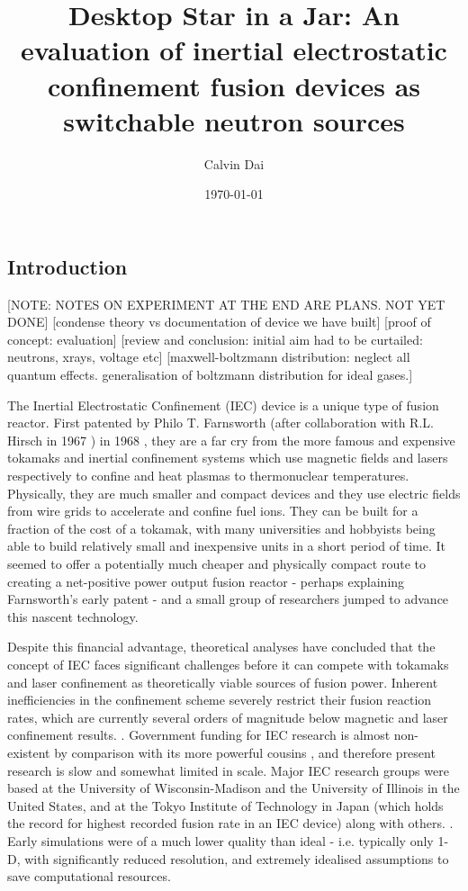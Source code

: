 \documentclass[a4paper,titlepage]{article}
\title{Desktop Star in a Jar: An evaluation of inertial electrostatic confinement fusion devices as switchable neutron sources}
\author{Calvin Dai}
\date{\today}
\let\cite\parencite
\begin{document}
 
\maketitle

\tableofcontents
\newpage
\newpage
\printglossaries
\begin{flushleft}

\section{Introduction}
\label{intro}
[NOTE: NOTES ON EXPERIMENT AT THE END ARE PLANS. NOT YET DONE]
[condense theory vs documentation of device we have built]
[proof of concept: evaluation]
[review and conclusion: initial aim had to be curtailed: neutrons, xrays, voltage etc]
[maxwell-boltzmann distribution: neglect all quantum effects. generalisation of boltzmann distribution for ideal gases.]

The Inertial Electrostatic Confinement (IEC) device is a unique type of fusion reactor. First patented by Philo T. Farnsworth (after collaboration with R.L. Hirsch in 1967 \cite{hirsch_1967_inertialelectrostatic}) in 1968 \cite{farnsworth_1968_method}, they are a far cry from the more famous and expensive tokamaks and inertial confinement systems which use magnetic fields and lasers respectively to confine and heat plasmas to thermonuclear temperatures. Physically, they are much smaller and compact devices and they use electric fields from wire grids to accelerate and confine fuel ions. They can be built for a fraction of the cost of a tokamak, with many universities and hobbyists being able to build relatively small and inexpensive units in a short period of time. It seemed to offer a potentially much cheaper and physically compact route to creating a net-positive power output fusion reactor - perhaps explaining Farnsworth's early patent - and a small group of researchers jumped to advance this nascent technology. \newline

Despite this financial advantage, theoretical analyses have concluded that the concept of IEC faces significant challenges before it can compete with tokamaks and laser confinement as theoretically viable sources of fusion power. Inherent inefficiencies in the confinement scheme severely restrict their fusion reaction rates, which are currently several orders of magnitude below magnetic and laser confinement results. \cite{rider_1995_a}\cite{miley_2013_inertial}. Government funding for IEC research is almost non-existent by comparison with its more powerful cousins \cite{miley_2013_inertial}, and therefore present research is slow and somewhat limited in scale. Major IEC research groups were based at the University of Wisconsin-Madison and the University of Illinois in the United States, and at the Tokyo Institute of Technology in Japan (which holds the record for highest recorded fusion rate in an IEC device) along with others. \cite{janphilippwulfkhler_2025_an}. 
Early simulations were of a much lower quality than ideal - i.e. typically only 1-D, with significantly reduced resolution, and extremely idealised assumptions to save computational resources. 


\end{flushleft}
\end{document}
